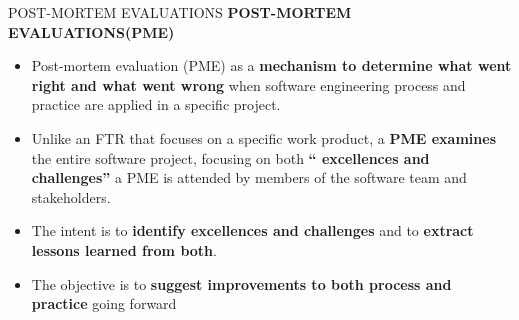 \documentclass{beamer}
\begin{document}
\begin{frame}{POST-MORTEM EVALUATIONS}
\textbf{POST-MORTEM EVALUATIONS(PME)}
\begin{itemize}
	\item Post-mortem evaluation (PME) as a \textbf{mechanism to determine what went right and what 
		went wrong }when software engineering process and practice are applied in a specific 
	project. 
	\item Unlike an FTR that focuses on a specific work product, a\textbf{ PME 
		examines} the entire software project, focusing on both \textbf{“ excellences 
		and challenges”} a PME is attended by members of the software team 
	and stakeholders.
	\item The intent is to\textbf{ identify excellences and challenges} and to \textbf{extract 
		lessons learned from both}. 
	\item The objective is to\textbf{ suggest improvements to both process and practice }
	going forward
\end{itemize}
\end{frame}
\end{document}
